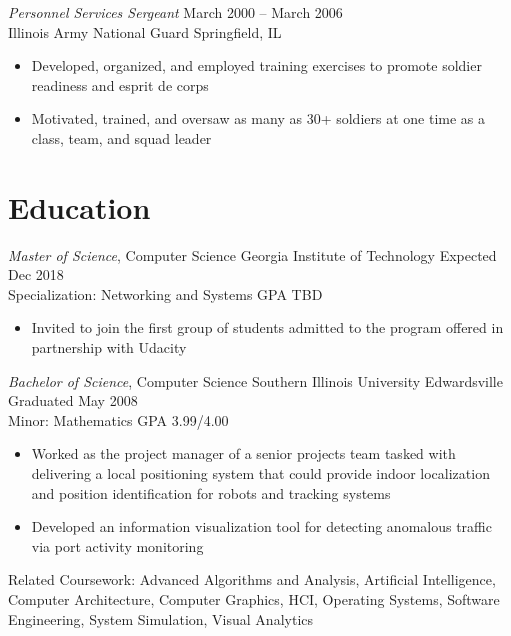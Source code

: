 \documentclass[margin,line]{resume}
\begin{document}
\begin{resume}
{\sl Personnel Services Sergeant}   \hfill   March 2000 -- March 2006\\
Illinois Army National Guard        \hfill   Springfield, IL
\begin{itemize} \itemsep -2pt %
\small\item Developed, organized, and employed training exercises to promote soldier readiness and esprit de corps
\small\item Motivated, trained, and oversaw as many as 30+ soldiers at one time as a class, team, and squad leader
\end{itemize}

\section{Education}
{\small
  {\sl Master of Science}, Computer Science \hfill
  Georgia Institute of Technology\hfill
  Expected Dec 2018\\
  Specialization: Networking and Systems \hfill
  GPA TBD%
}
\begin{itemize} \itemsep -2pt %
\small\item Invited to join the first group of students admitted to the program offered in partnership with Udacity
\end{itemize}

{\small
  {\sl Bachelor of Science}, Computer Science \hfill
  Southern Illinois University Edwardsville   \hfill
  Graduated May 2008\\
  Minor: Mathematics \hfill
  GPA 3.99/4.00
}
\begin{itemize} \itemsep -2pt %
\small\item Worked as the project manager of a senior projects team tasked with delivering a local positioning
            system that could provide indoor localization and position identification for robots and tracking systems
\small\item Developed an information visualization tool for detecting anomalous traffic via port activity monitoring
\end{itemize}

{\small
  Related Coursework: Advanced Algorithms and Analysis, Artificial Intelligence,
  Computer Architecture, Computer Graphics, HCI, Operating Systems, Software
  Engineering, System Simulation, Visual Analytics
}


\end{resume}
\end{document}
